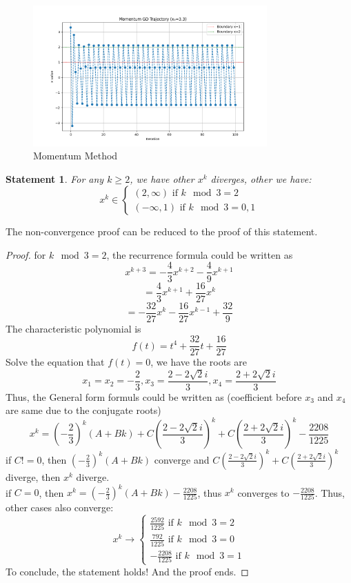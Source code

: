 \documentclass[a4 paper,12pt]{article}
\theoremstyle{definitionstyle}
\newtheorem{statement}{Statement}
\newenvironment{framedminipage}
    {\begin{framed}\begin{minipage}{0.9\textwidth}}
    {\end{minipage}\end{framed}}
\begin{document}
\begin{figure}[H]
  \centering
  \includegraphics[width=0.8\textwidth]{momentum_gd.png}
  \caption{Momentum Method}
\end{figure}
\begin{framedminipage}
  \begin{statement} For any $k\ge 2$, we have other $x^k$ diverges, other we have:
  \[
    x^k\in\begin{cases}
      (2,\infty)\text{ if }k\mod 3=2\\
      (-\infty,1)\text{ if }k\mod 3=0,1
    \end{cases}
  \]
  \end{statement}
\end{framedminipage}
The non-convergence proof can be reduced to the proof of this statement.
\begin{proof}
for $k\mod 3=2$, the recurrence formula could be written as 
\[
  x^{k+3}=-\frac{4}{3}x^{k+2}-\frac{4}{9}x^{k+1}
\]
\[
  =\frac{4}{3}x^{k+1}+\frac{16}{27}x^k
\]
\[
  =-\frac{32}{27}x^k-\frac{16}{27}x^{k-1}+\frac{32}{9}
\]
The characteristic polynomial is 
\[
  f(t)=t^4+\frac{32}{27}t+\frac{16}{27}
\]
Solve the equation that $f(t)=0$, we have the roots are 
\[
  x_1=x_2=-\frac{2}{3},x_3=\frac{2-2\sqrt{2}i}{3},x_4=\frac{2+2\sqrt{2}i}{3}
\]
Thus, the General form formuls could be written as (coefficient before $x_3$ and $x_4$ are same due to the conjugate roots)
\[
  x^k=(-\frac{2}{3})^k(A+Bk)+C(\frac{2-2\sqrt{2}i}{3})^k+C(\frac{2+2\sqrt{2}i}{3})^k-\frac{2208}{1225}
\]
if $C!=0$, then $(-\frac{2}{3})^k(A+Bk)$ converge and $C(\frac{2-2\sqrt{2}i}{3})^k+C(\frac{2+2\sqrt{2}i}{3})^k$ diverge, then $x^k$ diverge.\\
if $C=0$, then $x^k=(-\frac{2}{3})^k(A+Bk)-\frac{2208}{1225}$, thus $x^k$ converges to $-\frac{2208}{1225}$. Thus, other cases also converge:
\[
  x^k\to\begin{cases}
    \frac{2592}{1225}\text{ if }k\mod 3=2\\
    \frac{792}{1225}\text{ if }k\mod 3=0\\
    -\frac{2208}{1225}\text{ if }k\mod 3=1
  \end{cases}
\]
To conclude, the statement holds! And the proof ends.
\end{proof}
\end{document}
